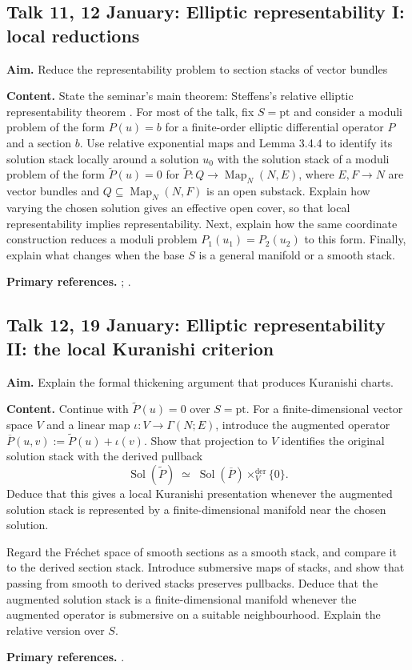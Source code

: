 \documentclass[11pt,a4paper]{article}
\newcommand{\Talk}[6]{%
  \subsection*{Talk #1, #2: #3}
  \textbf{Aim.} #4

  \textbf{Content.} #5

  \textbf{Primary references.} #6
  \par\medskip
}
\begin{document}
\Talk{11}{12 January}{Elliptic representability I: local reductions}
{Reduce the representability problem to section stacks of vector bundles}
{State the seminar's main theorem: Steffens's relative elliptic representability theorem \cite[Theorem~3.4.3]{Steffens_Representability_Elliptic_Moduli}. For most of the talk, fix $S = \mathrm{pt}$ and consider a moduli problem of the form $P(u) = b$ for a finite-order elliptic differential operator $P$ and a section $b$. Use relative exponential maps and Lemma 3.4.4 to identify its solution stack locally around a solution $u_0$ with the solution stack of a moduli problem of the form $\widetilde{P}(u) = 0$ for $\widetilde{P}\colon Q \to \operatorname{Map}_N(N,E)$, where $E,F \to N$ are vector bundles and $Q \subseteq \operatorname{Map}_N(N,F)$ is an open substack. Explain how varying the chosen solution gives an effective open cover, so that local representability implies representability. Next, explain how the same coordinate construction reduces a moduli problem $P_1(u_1) = P_2(u_2)$ to this form. Finally, explain what changes when the base $S$ is a general manifold or a smooth stack.}
{\textcite[Theorem~3.4.3, Proposition~3.2.19, Lemmas~3.2.20--3.2.21,
	Proposition~3.3.9, and Lemma~3.4.4]{Steffens_Representability_Elliptic_Moduli};
	\textcite[Introduction and the beginning of Section~5]{Pardon_Representability_Elliptic_Fredholm}.}

\Talk{12}{19 January}{Elliptic representability II: the local Kuranishi criterion}
{Explain the formal thickening argument that produces Kuranishi charts.}
{Continue with $\widetilde{P}(u) = 0$ over $S = \mathrm{pt}$. For a finite-dimensional vector space \(V\) and a linear map \(\iota\colon V\to\Gamma(N;E)\), introduce the augmented operator $\overline{P}(u,v) := \widetilde{P}(u) + \iota(v)$. Show that projection to \(V\) identifies the original solution stack with the derived pullback
\[
\operatorname{Sol}(\widetilde P) \; \simeq \; \operatorname{Sol}(\overline P)\times_V^{\mathrm{der}}\{0\}.
\]
Deduce that this gives a local Kuranishi presentation whenever the augmented solution stack is represented by a finite-dimensional manifold near the chosen solution.

Regard the Fr\'echet space of smooth sections as a smooth stack, and compare it to the derived section stack. Introduce submersive maps of stacks, and show that passing from smooth to derived stacks preserves pullbacks. Deduce that the augmented solution stack is a finite-dimensional manifold whenever the augmented operator is submersive on a suitable neighbourhood. Explain the relative version over $S$.}
{\textcite[Propositions~2.2.17--2.2.18 and Corollary~2.2.19;
	Propositions~3.1.7 and~3.1.9 and Lemma~3.2.11;
	the final pullback argument following the proof of claim~$(*)$ in Theorem~3.4.3;
	Proposition~2.1.48 and Corollary~2.1.49]{Steffens_Representability_Elliptic_Moduli}.}
\end{document}
